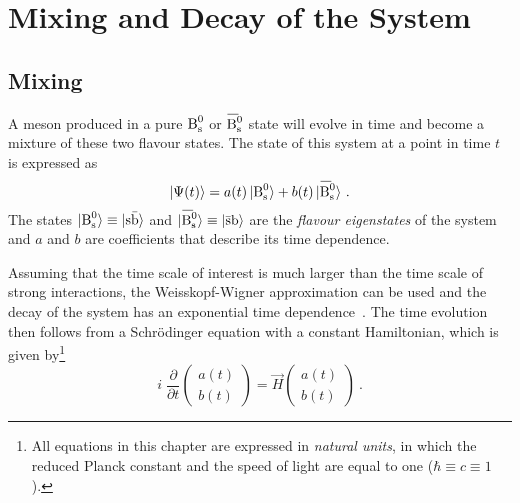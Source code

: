 \section{Mixing and Decay of the \texorpdfstring{\BsBsbar{}}{Bs0Bs0bar} System}

\subsection{Mixing}

A meson produced in a pure $\text{B}_\text{s}^0$ or $\Bsbar$ state will evolve in time and become a mixture of these two flavour states. The state of this
\BsBsbar{} system at a point in time $t$ is expressed as
\begin{equation}
  \label{eq:timeEvolBBbarState}
  |\Psi(t)\rangle = a(t)\,\Bsst + b(t)\,\Bsbarst
  \ .
\end{equation}
The states $|\text{B}_\text{s}^0\rangle\equiv|\text{s}\bar{\text{b}}\rangle$ and $\Bsbarst\equiv|\bar{\text{s}}\text{b}\rangle$ are the \emph{flavour
eigenstates} of the system and $a$ and $b$ are coefficients that describe its time dependence.

Assuming that the time scale of interest is much larger than the time scale of strong interactions, the Weisskopf-Wigner approximation can
be used and the decay of the system has an exponential time dependence~\cite{Weisskopf:1930au,*Weisskopf:1930ps,*Lee:1957qq}. The time
evolution then follows from a Schr\"odinger equation with a constant Hamiltonian, which is given by\footnote{All equations in this chapter
are expressed in \emph{natural units}, in which the reduced Planck constant and the speed of light are equal to one ($\hbar \equiv c \equiv
1$).}
\begin{equation}
  \label{eq:timeEvolSchr}
  i\; \frac{\partial}{\partial t} \begin{pmatrix} a(t) \\ b(t) \end{pmatrix}
    = \vec{H} \begin{pmatrix} a(t) \\ b(t) \end{pmatrix}
    \ .
\end{equation}

